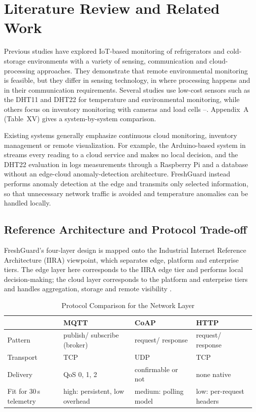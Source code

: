 \documentclass[conference]{IEEEtran}
\begin{document}
\section{Literature Review and Related Work}
Previous studies have explored IoT-based monitoring of refrigerators and cold-storage environments with a variety of sensing, communication and cloud-processing approaches. They demonstrate that remote environmental monitoring is feasible, but they differ in sensing technology, in where processing happens and in their communication requirements. Several studies use low-cost sensors such as the DHT11 and DHT22 for temperature and environmental monitoring, while others focus on inventory monitoring with cameras and load cells \cite{dong}--\cite{smartfridge}. Appendix~A (Table~XV) gives a system-by-system comparison.

Existing systems generally emphasize continuous cloud monitoring, inventory management or remote visualization. For example, the Arduino-based system in \cite{arduino} streams every reading to a cloud service and makes no local decision, and the DHT22 evaluation in \cite{ahmad} logs measurements through a Raspberry Pi and a database without an edge-cloud anomaly-detection architecture. FreshGuard instead performs anomaly detection at the edge and transmits only selected information, so that unnecessary network traffic is avoided and temperature anomalies can be handled locally.

\subsection{Reference Architecture and Protocol Trade-off}
FreshGuard's four-layer design is mapped onto the Industrial Internet Reference Architecture (IIRA) viewpoint, which separates edge, platform and enterprise tiers. The edge layer here corresponds to the IIRA edge tier and performs local decision-making; the cloud layer corresponds to the platform and enterprise tiers and handles aggregation, storage and remote visibility \cite{iira}.

\begin{table}[t]
\caption{Protocol Comparison for the Network Layer}
\label{tab:protocols}
\centering
\footnotesize
\begin{tabular}{p{}p{}p{}p{}}
\toprule
 & MQTT & CoAP & HTTP \\
\midrule
Pattern & publish/ subscribe (broker) & request/ response & request/ response \\
Transport & TCP & UDP & TCP \\
Delivery & QoS 0, 1, 2 & confirmable or not & none native \\
Fit for 30\,s telemetry & high: persistent, low overhead & medium: polling model & low: per-request headers \\
\bottomrule
\end{tabular}
\end{table}
\end{document}
